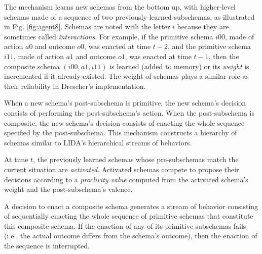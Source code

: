 \documentclass[runningheads]{llncs}
\begin{document}
The mechanism learns new schemas from the bottom up, with higher-level schemas made of a sequence of two previously-learned subschemas, 
as illustrated in Fig. \ref{fig:agent8}. 
Schemas are noted with the letter $i$ because they are sometimes called \textit{interactions}.
For example, if the primitive schema $i00$, made of action $a0$ and outcome $o0$, was enacted at time $t-2$, and the primitive schema $i11$, made of action $a1$ and outcome $o1$,  was enacted at time $t-1$, then the composite schema $(i00, a1, i11)$ is learned (added to memory) or its \textit{weight} is incremented if it already existed. 
The weight of schemas plays a similar role as their reliability in Drescher's implementation.

When a new schema's post-subschema is primitive, the new schema's decision consists of performing the post-subschema's action.
When the post-subschema is composite, the new schema's decision consists of enacting the whole sequence specified by the post-subschema. 
This mechanism constructs a hierarchy of schemas similar to LIDA's hierarchical streams of behaviors. 

At time $t$, the previously learned schemas whose pre-subschemas match the current situation are \textit{activated}.
Activated schemas compete to propose their decisions according to a \textit{proclivity value} computed from the activated schema's weight and the post-subschema's valence. 

A decision to enact a composite schema generates a stream of behavior consisting of sequentially enacting the whole sequence of primitive schemas that constitute this composite schema.  
If the enaction of any of its primitive subschemas fails (i.e., the actual outcome differs from the schema's outcome), then the enaction of the sequence is interrupted. 


\end{document}
